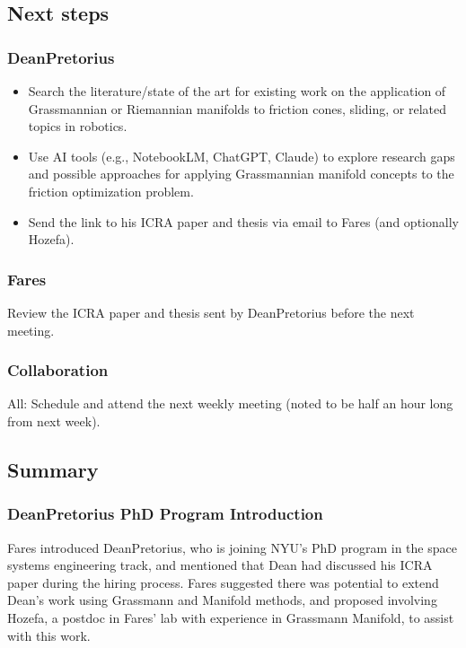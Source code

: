\subsection{Next steps}

\subsubsection{DeanPretorius}

\begin{itemize}
    \item Search the literature/state of the art for existing work on the application of Grassmannian or Riemannian manifolds to friction cones, sliding, or related topics in robotics.
    \item Use AI tools (e.g., NotebookLM, ChatGPT, Claude) to explore research gaps and possible approaches for applying Grassmannian manifold concepts to the friction optimization problem.
    \item Send the link to his ICRA paper and thesis via email to Fares (and optionally Hozefa).
\end{itemize}

\subsubsection{Fares}

Review the ICRA paper and thesis sent by DeanPretorius before the next meeting.

\subsubsection{Collaboration}

All: Schedule and attend the next weekly meeting (noted to be half an hour long from next week).

\subsection{Summary}

\subsubsection{DeanPretorius PhD Program Introduction}

Fares introduced DeanPretorius, who is joining NYU's PhD program in the space systems engineering track, and mentioned that Dean had discussed his ICRA paper during the hiring process. Fares suggested there was potential to extend Dean's work using Grassmann and Manifold methods, and proposed involving Hozefa, a postdoc in Fares' lab with experience in Grassmann Manifold, to assist with this work.

